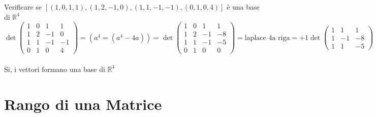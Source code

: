 \begin{esercizio}
	Verificare se $[(1,0,1,1),(1,2,-1,0),(1,1,-1,-1),(0,1,0,4)]$ è una base di $\mathbb{R}^4$\\
	$\det\begin{pmatrix}
		1 & 0 & 1 & 1\\
		1 & 2 & -1 & 0\\
		1 & 1 & -1 & -1\\
		0 & 1 & 0 & 4
	\end{pmatrix}=(a^4=(a^4-4a))=\det\begin{pmatrix}
		1 & 0 & 1 & 1\\
		1 & 2 & -1 & -8\\
		1 & 1 & -1 & -5\\
		0 & 1 & 0 & 0
	\end{pmatrix}=\text{laplace 4a riga}=+1\det\begin{pmatrix}
		1 & 1 & 1\\
		1 & -1 & -8\\
		1 & 1 & -5
	\end{pmatrix}=\det\begin{pmatrix}
		2 & 1 & 1\\
		0 & -1 & -8\\
		0 & -1 & -5
	\end{pmatrix}=\text{laplace 1a colonna}=2\det\begin{pmatrix}
		-1 & -8\\
		-1 & -5
	\end{pmatrix}=2(5-8)=-6$\\\\
	Si, i vettori formano una base di $\mathbb{R}^4$
\end{esercizio}

\section{Rango di una Matrice}

